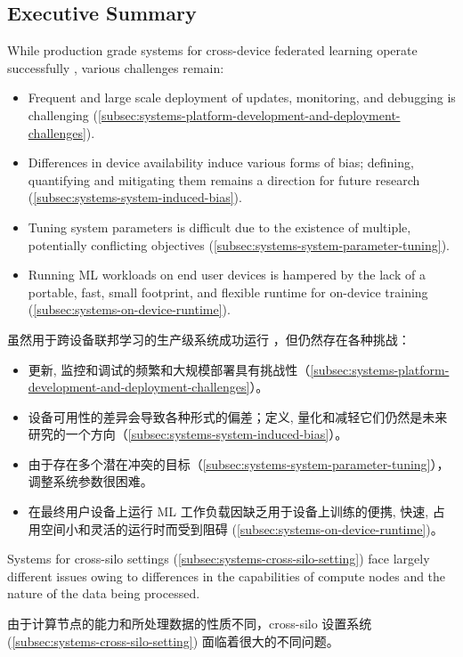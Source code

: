 \subsection{Executive Summary}
While production grade systems for cross-device federated learning operate successfully \cite{bonawitz19sysml,apple19wwdc}, various challenges remain:
\begin{itemize}
    \item Frequent and large scale deployment of updates, monitoring, and debugging is challenging (\cref{subsec:systems-platform-development-and-deployment-challenges}).
    \item Differences in device availability induce various forms of bias; defining, quantifying and mitigating them remains a direction for future research (\cref{subsec:systems-system-induced-bias}).
    \item Tuning system parameters is difficult due to the existence of multiple, potentially conflicting objectives (\cref{subsec:systems-system-parameter-tuning}).
    \item Running ML workloads on end user devices is hampered by the lack of a portable, fast, small footprint, and flexible runtime for on-device training (\cref{subsec:systems-on-device-runtime}).
\end{itemize}
虽然用于跨设备联邦学习的生产级系统成功运行 \cite{bonawitz19sysml,apple19wwdc}，但仍然存在各种挑战：
\begin{itemize}
    \item 更新, 监控和调试的频繁和大规模部署具有挑战性（\cref{subsec:systems-platform-development-and-deployment-challenges}）。
    \item 设备可用性的差异会导致各种形式的偏差；定义, 量化和减轻它们仍然是未来研究的一个方向（\cref{subsec:systems-system-induced-bias}）。
    \item 由于存在多个潜在冲突的目标（\cref{subsec:systems-system-parameter-tuning}），调整系统参数很困难。
    \item 在最终用户设备上运行 ML 工作负载因缺乏用于设备上训练的便携, 快速, 占用空间小和灵活的运行时而受到阻碍 (\cref{subsec:systems-on-device-runtime})。
\end{itemize}


Systems for cross-silo settings (\cref{subsec:systems-cross-silo-setting}) face largely different issues owing to differences in the capabilities of compute nodes and the nature of the data being processed.

由于计算节点的能力和所处理数据的性质不同，cross-silo 设置系统 (\cref{subsec:systems-cross-silo-setting}) 面临着很大的不同问题。


